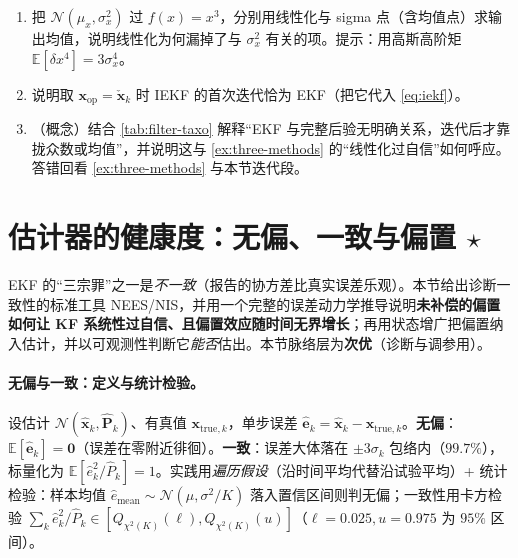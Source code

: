\begin{practice}
\begin{enumerate}
  \item 把 $\mathcal{N}(\mu_x,\sigma_x^2)$ 过 $f(x)=x^3$，分别用线性化与 sigma 点（含均值点）求输出均值，说明线性化为何漏掉了与 $\sigma_x^2$ 有关的项。提示：用高斯高阶矩 $\mathbb{E}[\delta x^4]=3\sigma_x^4$。
  \item 说明取 $\mathbf{x}_{\text{op}}=\check{\mathbf{x}}_k$ 时 IEKF 的首次迭代恰为 EKF（把它代入 \cref{eq:iekf}）。
  \item （概念）结合 \cref{tab:filter-taxo} 解释“EKF 与完整后验无明确关系，迭代后才靠拢众数或均值”，并说明这与 \cref{ex:three-methods} 的“线性化过自信”如何呼应。答错回看 \cref{ex:three-methods} 与本节迭代段。
\end{enumerate}
\end{practice}

\section{估计器的健康度：无偏、一致与偏置 \texorpdfstring{$\star$}{(进阶)}}
\label{sec:consistency}

EKF 的“三宗罪”之一是\emph{不一致}（报告的协方差比真实误差乐观）。本节给出诊断一致性的标准工具 NEES/NIS，并用一个完整的误差动力学推导说明\textbf{未补偿的偏置如何让 KF 系统性过自信、且偏置效应随时间无界增长}；再用状态增广把偏置纳入估计，并以可观测性判断它\emph{能否}估出。本节脉络层为\textbf{次优}（诊断与调参用）。

\paragraph{无偏与一致：定义与统计检验。}
设估计 $\mathcal{N}(\hat{\mathbf{x}}_k,\hat{\mathbf{P}}_k)$、有真值 $\mathbf{x}_{\text{true},k}$，单步误差 $\hat{\mathbf{e}}_k=\hat{\mathbf{x}}_k-\mathbf{x}_{\text{true},k}$。\textbf{无偏}：$\mathbb{E}[\hat{\mathbf{e}}_k]=\mathbf{0}$（误差在零附近徘徊）。\textbf{一致}：误差大体落在 $\pm3\sigma_k$ 包络内（$99.7\%$），标量化为 $\mathbb{E}[\hat{e}_k^2/\hat{P}_k]=1$\cite{barfoot2024state}。实践用\emph{遍历假设}（沿时间平均代替沿试验平均）+ 统计检验：样本均值 $\hat{e}_{\text{mean}}\sim\mathcal{N}(\mu,\sigma^2/K)$ 落入置信区间则判无偏；一致性用卡方检验 $\sum_k\hat{e}_k^2/\hat{P}_k\in[Q_{\chi^2(K)}(\ell),Q_{\chi^2(K)}(u)]$（$\ell=0.025,u=0.975$ 为 $95\%$ 区间）。

